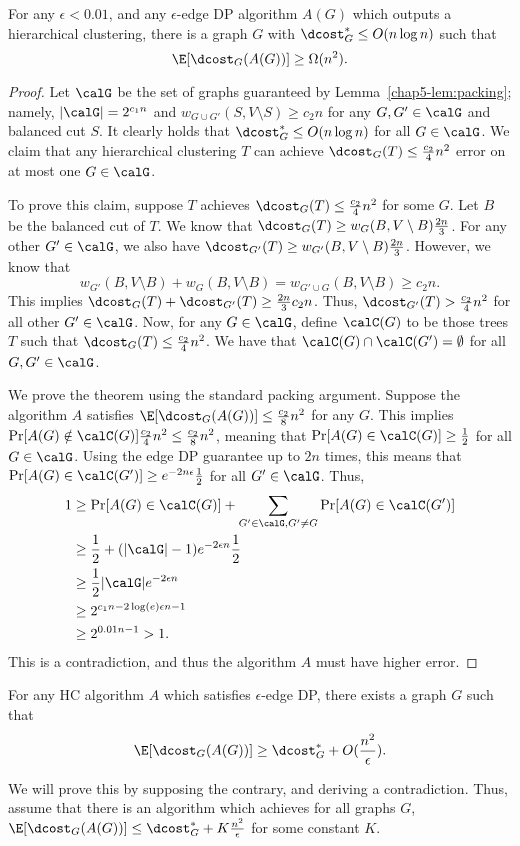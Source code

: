 \begin{thm}
For any $\epsilon < 0.01$, and any $\epsilon$-edge DP algorithm $A(G)$ which outputs a hierarchical clustering, there is a graph $G$ with $\dcost_G^* \leq O(n \log n)$ such that 
\[
    \E[\dcost_{G}(A(G))] \geq \Omega(n^2).
\]
\end{thm}
\begin{proof}
Let $\calG$ be the set of graphs guaranteed by Lemma~\ref{chap5-lem:packing}; namely, $|\calG| = 2^{c_1n}$ and $w_{G \cup G'}(S, V\setminus S) \geq c_2 n$ for any $G, G' \in \calG$ and balanced cut $S$. It clearly holds that $\dcost_G^* \leq O(n \log n)$ for all $G \in \calG$. We claim that any hierarchical clustering $T$ can achieve $\dcost_G(T) \leq \frac{c_2}{4}n^2$ error on at most one $G \in \calG$.

To prove this claim, suppose $T$ achieves $\dcost_G(T) \leq \frac{c_2}{4}n^2$ for some $G$. Let $B$ be the balanced cut of $T$. We know that $\dcost_G(T) \geq w_G(B, V \setminus B) \frac{2n}{3}$. For any other $G' \in \calG$, we also have $\dcost_{G'}(T) \geq w_{G'}(B, V \setminus B) \frac{2n}{3}$. However, we know that
\[
    w_{G'}(B, V \setminus B) + w_{G}(B, V \setminus B) = w_{G' \cup G}(B, V \setminus B) \geq c_2 n.
\]
This implies $\dcost_{G}(T) + \dcost_{G'}(T) \geq \frac{2n}{3}c_2 n$. Thus, $\dcost_{G'}(T) > \frac{c_2}{4}n^2$ for all other $G' \in \calG$. Now, for any $G \in \calG$, define $\calC(G)$ to be those trees $T$ such that $\dcost_G(T) \leq \frac{c_2}{4}n^2$. We have that $\calC(G) \cap \calC(G') = \emptyset$ for all $G,G' \in \calG$.

We prove the theorem using the standard packing argument. Suppose the algorithm $A$ satisfies $\E[\dcost_G(A(G))] \leq \frac{c_2}{8}n^2$ for any $G$. This implies $\Pr[A(G) \notin \calC(G)] \frac{c_2}{4} n^2 \leq \frac{c_2}{8}n^2$, meaning that $\Pr[A(G) \in \calC(G)] \geq \frac{1}{2}$ for all $G \in \calG$. Using the edge DP guarantee up to $2n$ times, this means that $\Pr[A(G) \in \calC(G')] \geq e^{-2n\epsilon} \frac{1}{2}$ for all $G' \in \calG$. Thus,
\begin{align*}
    1 &\geq \Pr[A(G) \in \calC(G)] + \sum_{G' \in \calG, G' \neq G} \Pr[A(G) \in \calC(G')] \\
    &\geq \frac{1}{2} +  (|\calG|-1)e^{-2\epsilon n} \frac{1}{2} \\
    &\geq \frac{1}{2}|\calG|e^{-2\epsilon n} \\
    &\geq 2^{c_1 n - 2\log(e)\epsilon n-1} \\
    &\geq 2^{0.01 n - 1} > 1.
\end{align*}
This is a contradiction, and thus the algorithm $A$ must have higher error.
\end{proof}
\iffalse
\begin{thm}
    For any HC algorithm $A$ which satisfies $\epsilon$-edge DP, there exists a graph $G$ such that
    \[
        \E[\dcost_G(A(G))] \geq \dcost_G^* + O(\frac{n^2}{\epsilon}).
    \]
\end{thm}
We will prove this by supposing the contrary, and deriving a contradiction. Thus, assume that there is an algorithm which achieves for all graphs $G$, $\E[\dcost_G(A(G))] \leq \dcost_G^* + K \frac{n^2}{\epsilon}$ for some constant $K$.

